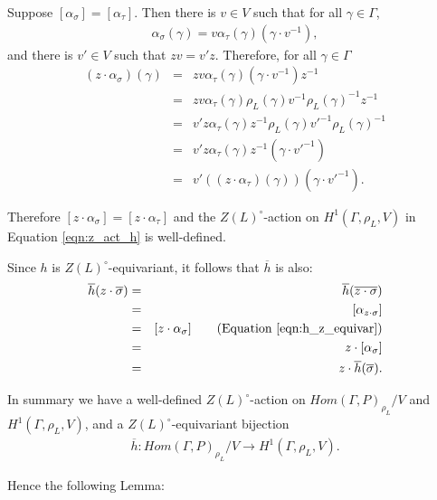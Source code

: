 Suppose $[\alpha_\sigma] = [\alpha_\tau]$. Then there is $v \in V$ such that for all $\gamma \in \Gamma$,
\begin{eqnarray*}
  \alpha_\sigma(\gamma) = v \alpha_\tau(\gamma) (\gamma \cdot v^{-1}),
\end{eqnarray*}
and there is $v' \in V$ such that $zv = v' z$. Therefore, for all $\gamma \in \Gamma$
\begin{eqnarray*}
	(z \cdot \alpha_\sigma)(\gamma) 
  &=& z v \alpha_\tau(\gamma) (\gamma \cdot v^{-1}) z^{-1} \\
  &=& z v \alpha_\tau(\gamma) \rho_L(\gamma) v^{-1} \rho_L(\gamma)^{-1} z^{-1} \\
  &=& v' z \alpha_\tau(\gamma) z^{-1} \rho_L(\gamma) v'^{-1} \rho_L(\gamma)^{-1} \\
  &=& v' z \alpha_\tau(\gamma) z^{-1} (\gamma \cdot v'^{-1}) \\
  &=& v' ((z \cdot \alpha_\tau)(\gamma)) (\gamma \cdot v'^{-1}).
\end{eqnarray*}

Therefore $[z \cdot \alpha_\sigma] = [z \cdot \alpha_\tau]$ and the $Z(L)^\circ$-action on $H^1(\Gamma, \rho_L, V)$ in Equation \ref{eqn:z_act_h} is well-defined.

Since $h$ is $Z(L)^\circ$-equivariant, it follows that $\overline{h}$ is also:
\begin{eqnarray*}
  \overline{h}(z \cdot \overline{\sigma}) &=& \overline{h}(\overline{z \cdot \sigma}) \\
  &=& [\alpha_{z \cdot \sigma}] \\
  &=& [z \cdot \alpha_\sigma] \qquad (\textrm{Equation }\ref{eqn:h_z_equivar}) \\
  &=& z \cdot [\alpha_\sigma] \\
  &=& z \cdot \overline{h}(\overline{\sigma}).
\end{eqnarray*}

In summary we have a well-defined $Z(L)^\circ$-action on $Hom(\Gamma, P)_{\rho_L}/V$ and $H^1(\Gamma, \rho_L, V)$, and a $Z(L)^\circ$-equivariant bijection 
\begin{eqnarray*}
  \overline{h}:Hom(\Gamma, P)_{\rho_L}/V \rightarrow H^1(\Gamma, \rho_L, V).
\end{eqnarray*}

Hence the following Lemma:

